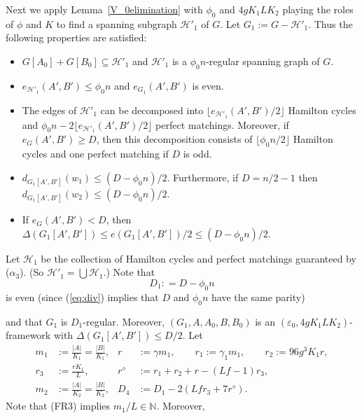 \documentclass{memo-l}
\def\COMMENT#1{}
\def\eps{\varepsilon}
\numberwithin{section}{chapter}
\numberwithin{equation}{section}
\numberwithin{firstthm}{section}
\numberwithin{figure}{section}
\begin{document}
{Next we apply Lemma~\ref{V_0elimination} with $\phi_0$ and $4g K_1LK_2$ playing the roles of $\phi$ and $K$ to find a
spanning subgraph $\mathcal{H}'_1$ of $G$.
Let $G_1:=G-\mathcal{H}'_1$. Thus the following properties are satisfied:
\begin{itemize}
	\item[{\rm ($\alpha_1$)}] $G[A_0]+G[B_0] \subseteq \mathcal{H}'_1$ and $\mathcal{H}'_1$ is a $\phi _0 n $-regular spanning graph of $G$.
	\item[{\rm ($\alpha_2$)}] $e_{\mathcal{H}'_1}(A',B') \le \phi_0 n$ and $e_{G_1}(A',B')$ is even.
	\item[{\rm ($\alpha_3$)}] The edges of $\mathcal{H}'_1$ can be decomposed into $\lfloor e_{\mathcal{H}'_1}(A',B')/2 \rfloor$ Hamilton cycles and
$\phi_0 n - 2\lfloor e_{\mathcal{H}'_1}(A',B')/2 \rfloor$ perfect matchings. 
Moreover, if $e_G(A',B') \ge D$, then this decomposition consists of $\lfloor \phi_0 n/2 \rfloor$
Hamilton cycles and one perfect matching if $D$ is odd.%
    \COMMENT{Daniela: reworded}
	\item[{\rm ($\alpha_4$)}] $ d_{G_1[A',B']}(w_1) \le (D-\phi_0 n)/2$.
	Furthermore, if $D = n/2-1$ then \\ $ d_{ G_1[A',B'] }(w_2) \le (D-\phi_0 n)/2$.
	\item[{\rm ($\alpha_5$)}] If $e_G(A',B') < D$, then $ \Delta( G_1[A',B'] ) \le e(G_1[A',B'])/2 \le (D-\phi_0 n)/2$.
\end{itemize}
Let $\mathcal{H}_1$ be the collection of Hamilton cycles and perfect matchings guaranteed by ($\alpha_3$). (So $\mathcal{H}'_1=\bigcup \mathcal{H}_1$.)
Note that 
\begin{equation} \label{eqD1}
D_1 : = D - \phi_0 n
\end{equation}
is even (since (\ref{eq:div}) implies that $D$ and $\phi_0 n$ have the same parity)%
    \COMMENT{Daniela: added brackets}
and that $G_1$ is $D_1$-regular. 
Moreover, $(G_1,A,A_0,B,B_0)$ is an $(\eps_0, 4g K_1 L K_2)$-framework with $ \Delta( G_1 [A' , B' ]) \le D/2$.
Let     
\begin{align}
m_1 & :=\frac{|A|}{K_1}=\frac{|B|}{K_1}, &
r  & :=  \gamma m_1, \qquad
r_1 := \gamma_1 m_1, \qquad
r_2:= 96g^3K_1r, \nonumber\\
r_3 & := \frac{rK_1}{L}, &
r^\diamond & := r_1 +r_2 +r -(Lf -1)r_3, \nonumber\\
m_2 & := \frac{|A|}{K_2}=\frac{|B|}{K_2}, &
D_4 & :=D_1-2(Lfr_3+7r^\diamond). \label{D4eq}
\end{align}
Note that (FR3) implies $m_1/L\in \mathbb{N}$. Moreover, 
}
\end{document}
